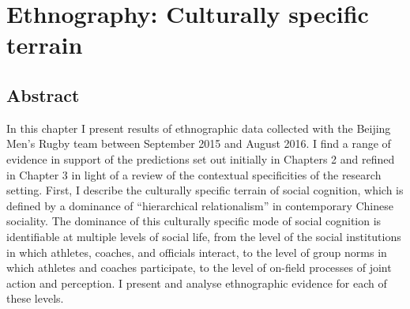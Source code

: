 \chapter{\label{chap:ethnoField}Ethnography: Culturally specific terrain}

\minitoc


\section{Abstract}
In this chapter I present results of ethnographic data collected with the Beijing Men's Rugby team between September 2015 and August 2016.  I find a range of evidence in support of the predictions set out initially in Chapters 2 and refined in Chapter 3 in light of a review of the contextual specificities of the research setting.  First, I describe the culturally specific terrain of social cognition, which is defined by a dominance of ``hierarchical relationalism'' in contemporary Chinese sociality.  The dominance of this culturally specific mode of social cognition is identifiable at multiple levels of social life, from the level of the social institutions in which athletes, coaches, and officials interact, to the level of group norms in which athletes and coaches participate, to the level of on-field processes of joint action and perception.  I present and analyse ethnographic evidence for each of these levels.

